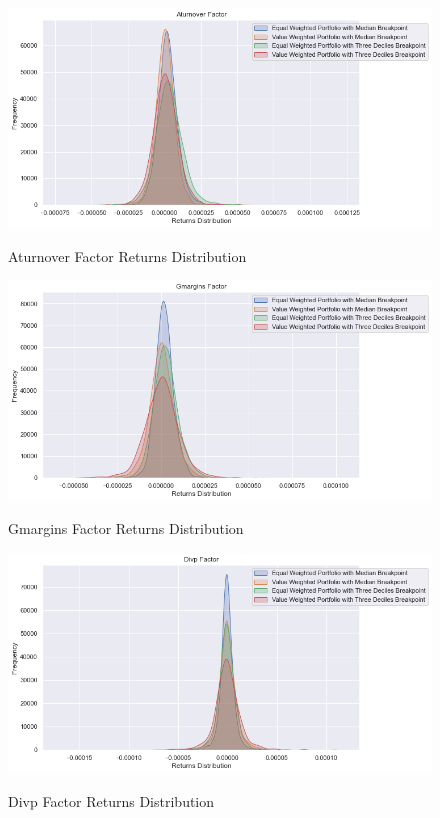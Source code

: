 \begin{figure}[H]
	\caption{Aturnover Factor Returns Distribution}
	\centering
	\includegraphics[scale=.63]{../../output/figures/aturnover.png}
	\label{fig:aturnover}
\end{figure}

\begin{figure}[H]
	\caption{Gmargins Factor Returns Distribution}
	\centering
	\includegraphics[scale=.63]{../../output/figures/gmargins.png}
	\label{fig:gmargins}
\end{figure}

\begin{figure}[H]
	\caption{Divp Factor Returns Distribution}
	\centering
	\includegraphics[scale=.63]{../../output/figures/divp.png}
	\label{fig:divp}
\end{figure}

